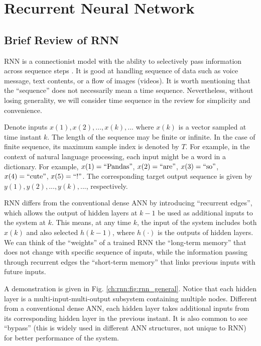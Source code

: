 \chapter{Recurrent Neural Network} \label{ch:rnn}

\section{Brief Review of RNN}

RNN is a connectionist model with the ability to selectively pass information across sequence steps \cite{lipton2015critical}. It is good at handling sequence of data such as voice message, text contents, or a flow of images (videos). It is worth mentioning that the ``sequence'' does not necessarily mean a time sequence. Nevertheless, without losing generality, we will consider time sequence in the review for simplicity and convenience.

Denote inputs $x(1), x(2), ..., x(k), ...$ where $x(k)$ is a vector sampled at time instant $k$. The length of the sequence may be finite or infinite. In the case of finite sequence, its maximum sample index is denoted by $T$. For example, in the context of natural language processing, each input might be a word in a dictionary. For example, $x(1) = \textup{``Pandas''}$, $x(2)=\textup{``are''}$, $x(3)=\textup{``so''}$, $x(4)=\textup{``cute''}$, $x(5)=\textup{``!''}$. The corresponding target output sequence is given by $y(1), y(2), ..., y(k), ...$, respectively.

RNN differs from the conventional dense ANN by introducing ``recurrent edges'', which allows the output of hidden layers at $k-1$ be used as additional inputs to the system at $k$. This means, at any time $k$, the input of the system includes both $x(k)$ and also selected $h(k-1)$, where $h(\cdot)$ is the outputs of hidden layers. We can think of the ``weights'' of a trained RNN the ``long-term memory'' that does not change with specific sequence of inputs, while the information passing through recurrent edges the ``short-term memory'' that links previous inputs with future inputs.

A demonstration is given in Fig. \ref{ch:rnn:fig:rnn_general}. Notice that each hidden layer is a multi-input-multi-output subsystem containing multiple nodes. Different from a conventional dense ANN, each hidden layer takes additional inputs from its corresponding hidden layer in the previous instant. It is also common to see ``bypass'' (this is widely used in different ANN structures, not unique to RNN) for better performance of the system.

